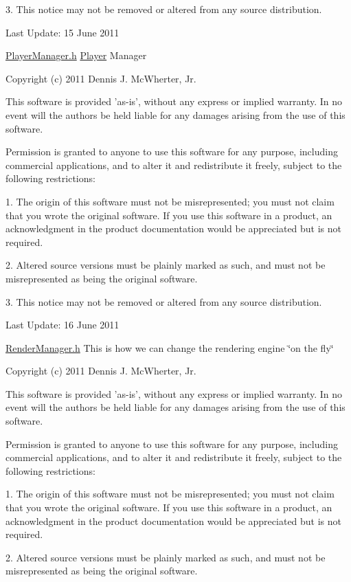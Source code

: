3. This notice may not be removed or altered from any source distribution.

Last Update: 15 June 2011

\hyperlink{_player_manager_8h_source}{PlayerManager.h} \hyperlink{class_micro_f_p_s_1_1_player}{Player} Manager

Copyright (c) 2011 Dennis J. McWherter, Jr.

This software is provided 'as-\/is', without any express or implied warranty. In no event will the authors be held liable for any damages arising from the use of this software.

Permission is granted to anyone to use this software for any purpose, including commercial applications, and to alter it and redistribute it freely, subject to the following restrictions:

1. The origin of this software must not be misrepresented; you must not claim that you wrote the original software. If you use this software in a product, an acknowledgment in the product documentation would be appreciated but is not required.

2. Altered source versions must be plainly marked as such, and must not be misrepresented as being the original software.

3. This notice may not be removed or altered from any source distribution.

Last Update: 16 June 2011

\hyperlink{_render_manager_8h_source}{RenderManager.h} This is how we can change the rendering engine \char`\"{}on the fly\char`\"{}

Copyright (c) 2011 Dennis J. McWherter, Jr.

This software is provided 'as-\/is', without any express or implied warranty. In no event will the authors be held liable for any damages arising from the use of this software.

Permission is granted to anyone to use this software for any purpose, including commercial applications, and to alter it and redistribute it freely, subject to the following restrictions:

1. The origin of this software must not be misrepresented; you must not claim that you wrote the original software. If you use this software in a product, an acknowledgment in the product documentation would be appreciated but is not required.

2. Altered source versions must be plainly marked as such, and must not be misrepresented as being the original software.

